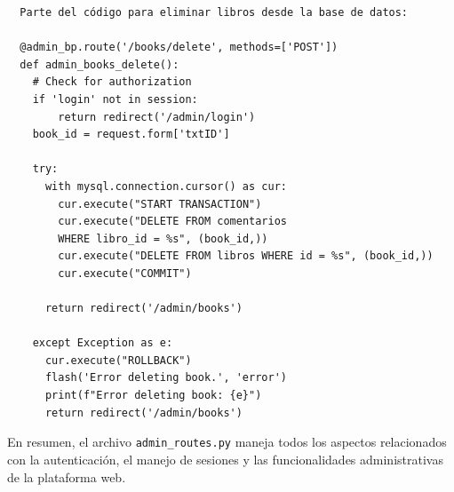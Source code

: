 \documentclass[a4paper, 12pt]{book}
\begin{document}
\begin{verbatim}
  Parte del código para eliminar libros desde la base de datos:

  @admin_bp.route('/books/delete', methods=['POST'])
  def admin_books_delete():
    # Check for authorization
    if 'login' not in session:
        return redirect('/admin/login')
    book_id = request.form['txtID']

    try:
      with mysql.connection.cursor() as cur:
        cur.execute("START TRANSACTION")
        cur.execute("DELETE FROM comentarios 
        WHERE libro_id = %s", (book_id,))
        cur.execute("DELETE FROM libros WHERE id = %s", (book_id,))
        cur.execute("COMMIT")

      return redirect('/admin/books')

    except Exception as e:
      cur.execute("ROLLBACK")
      flash('Error deleting book.', 'error')
      print(f"Error deleting book: {e}")
      return redirect('/admin/books')
\end{verbatim}

En resumen, el archivo \texttt{admin\_routes.py} maneja todos los aspectos relacionados con la autenticación, el manejo de sesiones y las funcionalidades administrativas de la plataforma web.
\end{document}
